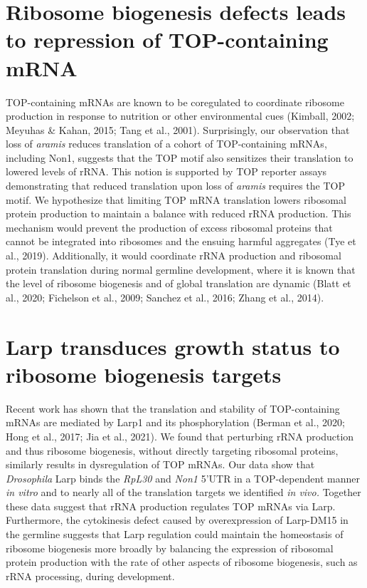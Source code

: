 \documentclass[12pt,twoside]{reedthesis}
\begin{document}
\hypertarget{ribosome-biogenesis-defects-leads-to-repression-of-top-containing-mrna}{%
\section{Ribosome biogenesis defects leads to repression of TOP-containing mRNA}\label{ribosome-biogenesis-defects-leads-to-repression-of-top-containing-mrna}}

TOP-containing mRNAs are known to be coregulated to coordinate ribosome
production in response to nutrition or other environmental cues
(Kimball, 2002; Meyuhas \& Kahan, 2015; Tang et al., 2001). Surprisingly, our observation
that loss of \emph{aramis} reduces translation of a cohort of TOP-containing
mRNAs, including Non1, suggests that the TOP motif also sensitizes their
translation to lowered levels of rRNA. This notion is supported by TOP
reporter assays demonstrating that reduced translation upon loss of
\emph{aramis} requires the TOP motif. We hypothesize that limiting TOP mRNA
translation lowers ribosomal protein production to maintain a balance
with reduced rRNA production. This mechanism would prevent the
production of excess ribosomal proteins that cannot be integrated into
ribosomes and the ensuing harmful aggregates
(Tye et al., 2019). Additionally, it would
coordinate rRNA production and ribosomal protein translation during
normal germline development, where it is known that the level of
ribosome biogenesis and of global translation are dynamic
(Blatt et al., 2020; Fichelson et al., 2009; Sanchez et al., 2016; Zhang et al., 2014).

\hypertarget{larp-transduces-growth-status-to-ribosome-biogenesis-targets}{%
\section{Larp transduces growth status to ribosome biogenesis targets}\label{larp-transduces-growth-status-to-ribosome-biogenesis-targets}}

Recent work has shown that the translation and stability of
TOP-containing mRNAs are mediated by Larp1 and its phosphorylation
(Berman et al., 2020; Hong et al., 2017; Jia et al., 2021). We found that perturbing rRNA production
and thus ribosome biogenesis, without directly targeting ribosomal
proteins, similarly results in dysregulation of TOP mRNAs. Our data show
that \emph{Drosophila} Larp binds the \emph{RpL30} and \emph{Non1} 5'UTR in a
TOP-dependent manner \emph{in vitro} and to nearly all of the translation
targets we identified \emph{in vivo.} Together these data suggest that rRNA
production regulates TOP mRNAs via Larp. Furthermore, the cytokinesis
defect caused by overexpression of Larp-DM15 in the germline suggests
that Larp regulation could maintain the homeostasis of ribosome
biogenesis more broadly by balancing the expression of ribosomal protein
production with the rate of other aspects of ribosome biogenesis, such
as rRNA processing, during development.
\end{document}
